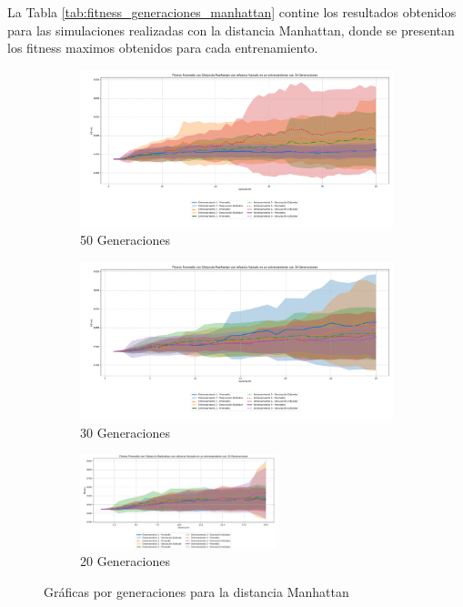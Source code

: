 \documentclass[lettersize, journal]{IEEEtran}
\begin{document}
La Tabla \ref{tab:fitness_generaciones_manhattan} contine los resultados obtenidos para las simulaciones realizadas con la distancia Manhattan, donde se presentan los fitness maximos obtenidos para cada entrenamiento.
\begin{figure}[ht]
    \centering
    \begin{subfigure}{0.3\textwidth}
        \centering
        \includegraphics[width=\textwidth]{Manhattan/Fitness_Acumulado_Manh_50Gen.png}
        \caption{50 Generaciones}
        \label{fig:manh_50gen}
    \end{subfigure}
    \hfill
    \begin{subfigure}{0.3\textwidth}
        \centering
        \includegraphics[width=\textwidth]{Manhattan/Fitness_Acumulado_Manh30Gen.png}
        \caption{30 Generaciones}
        \label{fig:manh_30gen}
    \end{subfigure}
    \hfill
    \begin{subfigure}{0.3\textwidth}
        \centering
        \includegraphics[width=\textwidth, height=2.74cm]{Manhattan/Fitness_Acumulado_Manh_20Gen.png}
        \caption{20 Generaciones}
        \label{fig:manh_20gen}
    \end{subfigure}
    \caption{Gráficas por generaciones para la distancia Manhattan}
    \label{fig:graficas_generales_manhattan}
\end{figure}
\end{document}
